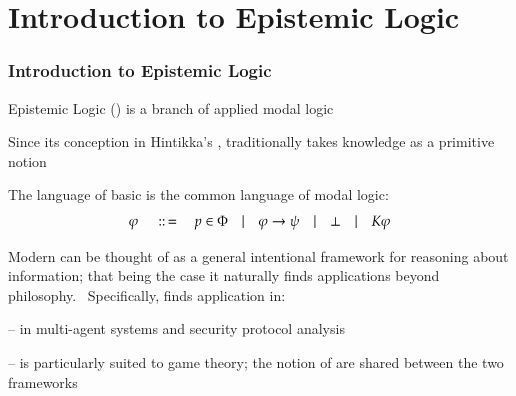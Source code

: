 

% 

\section{Introduction to Epistemic Logic}
\begin{frame}[allowframebreaks]
\frametitle{Introduction to Epistemic Logic}
\begin{itemizedot}
  \item Epistemic Logic () is a branch of applied modal logic
  
  \item Since its conception in Hintikka's ,  traditionally takes
  knowledge as a primitive notion
  
  \item The language of basic  is the common language of modal
  logic:
  \[ \varphi \hspace{1em} \,::\, = \hspace{1em} p \in \Phi \hspace{1em} |
     \hspace{1em} \varphi \rightarrow \psi \hspace{1em} | \hspace{1em} \bot
     \hspace{1em} | \hspace{1em} K \varphi \]
\end{itemizedot}
\framebreak
\begin{itemizedot}
  \item Modern  can be thought of as a general intentional
  framework for reasoning about information; that being the case it naturally
  finds applications beyond philosophy. \ Specifically,  finds
  application in:
  \begin{itemizedot}
    \item {} -- in multi-agent systems and security
    protocol analysis
    
    \item {} --  is particularly suited to game
    theory; the notion of {} are shared between the
    two frameworks
  \end{itemizedot}
\end{itemizedot}
\end{frame}
